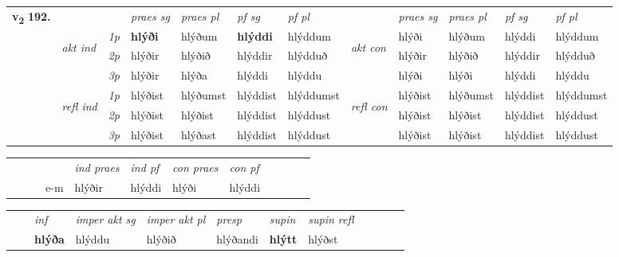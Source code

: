 \begin{tabular}{llllllllllll} \toprule
\multirow{4}{*}{{{\textbf{v{\textsubscript{2}}} \Large{\textbf{192.}}}}}  & &   &  \textit{praes sg}  & \textit{praes pl}  &\textit{ pf sg} & \textit{pf pl} &  &  \textit{praes sg}  & \textit{praes pl}  & \textit{pf sg} & \textit{pf pl } \\*
	\cmidrule{4-7} \cmidrule{9-12}
 & \multirow{3}{*}{\begin{turn}{90}\textit{akt ind}\end{turn}} & {\textit{1p}} & \textbf{hlýði} & hlýðum    & \textbf{hlýddi} & hlýddum & \multirow{3}{*}{\begin{turn}{90}\textit{akt con}\end{turn}} &hlýði & hlýðum & hlýddi & hlýddum\\*
& &  {\textit{2p}} &  hlýðir  & hlýðið   & hlýddir & hlýdduð & & hlýðir & hlýðið & hlýddir & hlýdduð \\*
& &  {\textit{3p}} & hlýðir & hlýða   & hlýddi & hlýddu & & hlýði & hlýði& hlýddi & hlýddu  \\*
\cmidrule{4-7} \cmidrule{9-12}
 &\multirow{3}{*}{\begin{turn}{90}\textit{refl ind}\end{turn}} & {\textit{1p}} & hlýðist & hlýðumst    & hlýddist & hlýddumst & \multirow{3}{*}{\begin{turn}{90}\textit{refl con}\end{turn}}  &hlýðist & hlýðumst & hlýddist & hlýddumst\\*
 &&  {\textit{2p}} &  hlýðist  & hlýðist   & hlýddist & hlýddust & &hlýðist & hlýðist & hlýddist & hlýddust \\*
& &  {\textit{3p}} & hlýðist & hlýðast   & hlýddist & hlýddust & & hlýðist & hlýðist& hlýddist & hlýddust  \\*
\cmidrule{4-7} \cmidrule{9-12}
\end{tabular}


\begin{tabular}{llllllllllll}
 & &  & &  \textit{ind praes} & \textit{ind pf} & \textit{con praes} & \textit{con pf} \\*
&  & & e-m & hlýðir & hlýddi & hlýði & hlýddi \\*
\cmidrule{5-9}
\end{tabular}


\begin{tabular}{llllllllllll}
 & & \textit{inf} & \textit{imper akt sg} & \textit{imper akt pl}   & \textit{presp} & \textit{supin} & \textit{supin refl}      \\*
  & & \textbf{hlýða} & hlýddu  & hlýðið   & hlýðandi &  \textbf{hlýtt} & hlýðst  \\*
\cmidrule{1-12}
\end{tabular}




